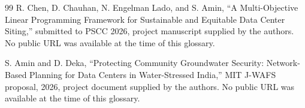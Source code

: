 \documentclass[10pt]{article}
\begin{document}
\begin{thebibliography}{99}
R. Chen, D. Chauhan, N. Engelman Lado, and S. Amin, ``A Multi-Objective Linear Programming Framework for Sustainable and Equitable Data Center Siting,'' submitted to PSCC 2026, project manuscript supplied by the authors. No public URL was available at the time of this glossary.

S. Amin and D. Deka, ``Protecting Community Groundwater Security: Network-Based Planning for Data Centers in Water-Stressed India,'' MIT J-WAFS proposal, 2026, project document supplied by the authors. No public URL was available at the time of this glossary.

\end{thebibliography}
\end{document}
